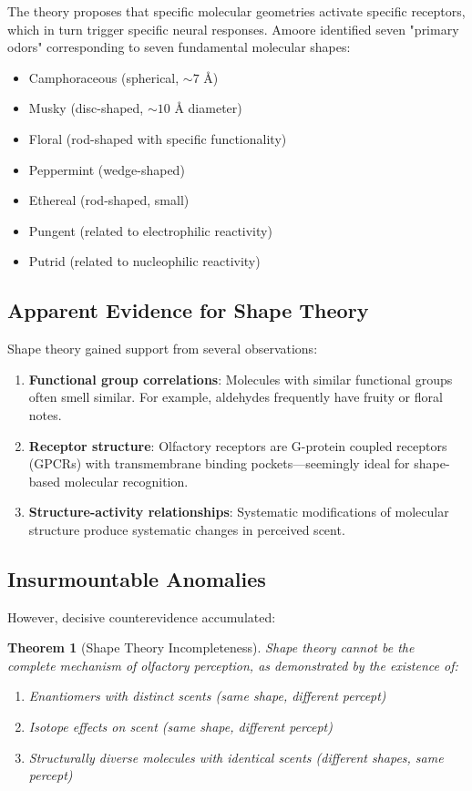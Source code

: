 \documentclass[12pt,a4paper]{article}
\newtheorem{theorem}{Theorem}
\begin{document}
The theory proposes that specific molecular geometries activate specific receptors, which in turn trigger specific neural responses. Amoore identified seven "primary odors" corresponding to seven fundamental molecular shapes:
\begin{itemize}
\item Camphoraceous (spherical, $\sim 7$ Å)
\item Musky (disc-shaped, $\sim 10$ Å diameter)
\item Floral (rod-shaped with specific functionality)
\item Peppermint (wedge-shaped)
\item Ethereal (rod-shaped, small)
\item Pungent (related to electrophilic reactivity)
\item Putrid (related to nucleophilic reactivity)
\end{itemize}

\subsection{Apparent Evidence for Shape Theory}

Shape theory gained support from several observations:

\begin{enumerate}
\item \textbf{Functional group correlations}: Molecules with similar functional groups often smell similar. For example, aldehydes frequently have fruity or floral notes.

\item \textbf{Receptor structure}: Olfactory receptors are G-protein coupled receptors (GPCRs) with transmembrane binding pockets—seemingly ideal for shape-based molecular recognition.

\item \textbf{Structure-activity relationships}: Systematic modifications of molecular structure produce systematic changes in perceived scent.
\end{enumerate}

\subsection{Insurmountable Anomalies}

However, decisive counterevidence accumulated:

\begin{theorem}[Shape Theory Incompleteness]
\label{thm:shape_incompleteness}
Shape theory cannot be the complete mechanism of olfactory perception, as demonstrated by the existence of:
\begin{enumerate}
\item Enantiomers with distinct scents (same shape, different percept)
\item Isotope effects on scent (same shape, different percept)
\item Structurally diverse molecules with identical scents (different shapes, same percept)
\end{enumerate}
\end{theorem}
\end{document}
